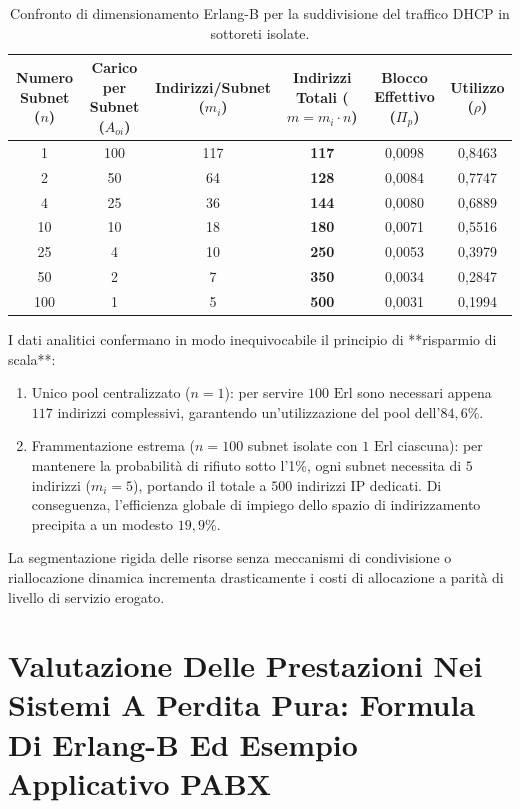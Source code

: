 \documentclass[11pt, a4paper]{article}
\begin{document}
\begin{table}[H]
\centering
\caption{Confronto di dimensionamento Erlang-B per la suddivisione del traffico DHCP in sottoreti isolate.}
\begin{tabularx}{\textwidth}{cccccc}
\toprule
\textbf{Numero Subnet} ($n$) & \textbf{Carico per Subnet} ($A_{oi}$) & \textbf{Indirizzi/Subnet} ($m_i$) & \textbf{Indirizzi Totali} ($m = m_i \cdot n$) & \textbf{Blocco Effettivo} ($\Pi_p$) & \textbf{Utilizzo} ($\rho$) \\
\midrule
1   & 100 & 117 & \textbf{117} & 0{,}0098 & 0{,}8463 \\
2   & 50  & 64  & \textbf{128} & 0{,}0084 & 0{,}7747 \\
4   & 25  & 36  & \textbf{144} & 0{,}0080 & 0{,}6889 \\
10  & 10  & 18  & \textbf{180} & 0{,}0071 & 0{,}5516 \\
25  & 4   & 10  & \textbf{250} & 0{,}0053 & 0{,}3979 \\
50  & 2   & 7   & \textbf{350} & 0{,}0034 & 0{,}2847 \\
100 & 1   & 5   & \textbf{500} & 0{,}0031 & 0{,}1994 \\
\bottomrule
\end{tabularx}
\end{table}

I dati analitici confermano in modo inequivocabile il principio di **risparmio di scala**:
\begin{enumerate}
    \item Unico pool centralizzato ($n=1$): per servire $100\text{ Erl}$ sono necessari appena $117$ indirizzi complessivi, garantendo un'utilizzazione del pool dell'$84{,}6\%$.
    \item Frammentazione estrema ($n=100$ subnet isolate con $1\text{ Erl}$ ciascuna): per mantenere la probabilità di rifiuto sotto l'1\%, ogni subnet necessita di $5$ indirizzi ($m_i=5$), portando il totale a $500$ indirizzi IP dedicati. Di conseguenza, l'efficienza globale di impiego dello spazio di indirizzamento precipita a un modesto $19{,}9\%$.
\end{enumerate}
La segmentazione rigida delle risorse senza meccanismi di condivisione o riallocazione dinamica incrementa drasticamente i costi di allocazione a parità di livello di servizio erogato.


\section{Valutazione Delle Prestazioni Nei Sistemi A Perdita Pura: Formula Di Erlang-B Ed Esempio Applicativo PABX}
\end{document}
